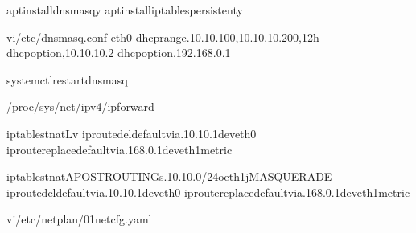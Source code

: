 \documentclass[letterpaper,10pt,english]{sphinxmanual}
\begin{document}
\begin{sphinxVerbatim}[commandchars=\\\{\}]
aptinstalldnsmasq\PYGZhy{}y
aptinstalliptables\PYGZhy{}persistent\PYGZhy{}y

vi/etc/dnsmasq.conf
eth0
dhcp\PYGZhy{}range.10.10.100,10.10.10.200,12h
dhcp\PYGZhy{}option,10.10.10.2
dhcp\PYGZhy{}option,192.168.0.1

systemctlrestartdnsmasq

\PYGZgt{}/proc/sys/net/ipv4/ip\PYGZus{}forward

iptables\PYGZhy{}tnat\PYGZhy{}L\PYGZhy{}v
iproutedeldefaultvia.10.10.1deveth0
iproutereplacedefaultvia.168.0.1deveth1metric

iptables\PYGZhy{}tnat\PYGZhy{}APOSTROUTING\PYGZhy{}s.10.10.0/24\PYGZhy{}oeth1\PYGZhy{}jMASQUERADE
iproutedeldefaultvia.10.10.1deveth0
iproutereplacedefaultvia.168.0.1deveth1metric



vi/etc/netplan/01\PYGZhy{}netcfg.yaml
\end{sphinxVerbatim}
\end{document}
